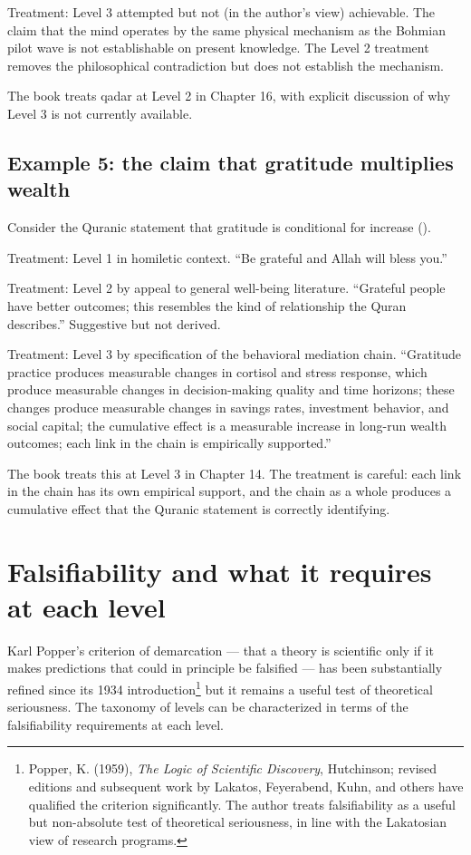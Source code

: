 Treatment: Level 3 attempted but not (in the author's view)
achievable. The claim that the mind operates by the same physical
mechanism as the Bohmian pilot wave is not establishable on present
knowledge. The Level 2 treatment removes the philosophical
contradiction but does not establish the mechanism.

The book treats qadar at Level 2 in Chapter 16, with explicit
discussion of why Level 3 is not currently available.

\subsection{Example 5: the claim that gratitude multiplies wealth}

Consider the Quranic statement that gratitude is conditional for
increase ().

Treatment: Level 1 in homiletic context. ``Be grateful and Allah
will bless you.''

Treatment: Level 2 by appeal to general well-being literature.
``Grateful people have better outcomes; this resembles the kind of
relationship the Quran describes.'' Suggestive but not derived.

Treatment: Level 3 by specification of the behavioral mediation
chain. ``Gratitude practice produces measurable changes in cortisol
and stress response, which produce measurable changes in
decision-making quality and time horizons; these changes produce
measurable changes in savings rates, investment behavior, and social
capital; the cumulative effect is a measurable increase in long-run
wealth outcomes; each link in the chain is empirically supported.''

The book treats this at Level 3 in Chapter 14. The treatment is
careful: each link in the chain has its own empirical support, and
the chain as a whole produces a cumulative effect that the Quranic
statement is correctly identifying.

\section{Falsifiability and what it requires at each level}
\label{sec:falsifiability}

Karl Popper's criterion of demarcation --- that a theory is
scientific only if it makes predictions that could in principle be
falsified --- has been substantially refined since its 1934
introduction\footnote{Popper, K. (1959), \emph{The Logic of Scientific
Discovery}, Hutchinson; revised editions and subsequent work by
Lakatos, Feyerabend, Kuhn, and others have qualified the criterion
significantly. The author treats falsifiability as a useful but
non-absolute test of theoretical seriousness, in line with the
Lakatosian view of research programs.} but it remains a useful test
of theoretical seriousness. The taxonomy of levels can be
characterized in terms of the falsifiability requirements at each
level.

